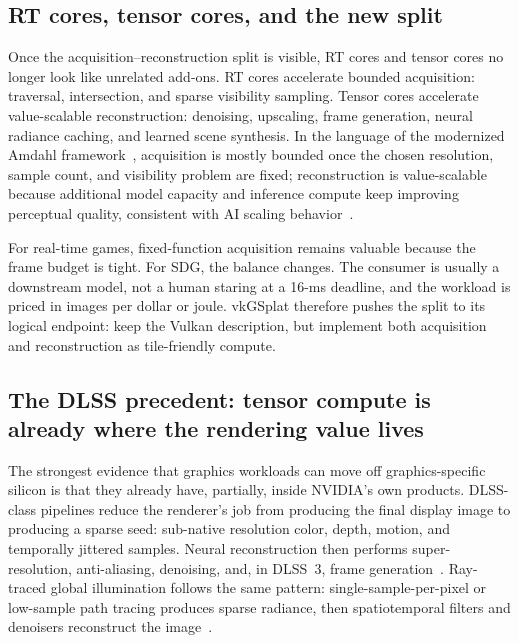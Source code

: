 \documentclass[10pt,journal]{IEEEtran}
\begin{document}
\subsection{RT cores, tensor cores, and the new split}

Once the acquisition--reconstruction split is visible, RT cores and
tensor cores no longer look like unrelated add-ons. RT cores accelerate
bounded acquisition: traversal, intersection, and sparse visibility
sampling. Tensor cores accelerate value-scalable reconstruction:
denoising, upscaling, frame generation, neural radiance caching, and
learned scene synthesis. In the language of the modernized Amdahl
framework~\cite{lu2026amdahl}, acquisition is mostly bounded once the
chosen resolution, sample count, and visibility problem are fixed;
reconstruction is value-scalable because additional model capacity and
inference compute keep improving perceptual quality, consistent with AI
scaling behavior~\cite{kaplan2020,lu2026}.

For real-time games, fixed-function acquisition remains valuable because
the frame budget is tight. For SDG, the balance changes. The consumer is
usually a downstream model, not a human staring at a 16-ms deadline, and
the workload is priced in images per dollar or joule. vkGSplat therefore
pushes the split to its logical endpoint: keep the Vulkan description,
but implement both acquisition and reconstruction as tile-friendly
compute.

\subsection{The DLSS precedent: tensor compute is already where the
rendering value lives}
\label{sec:dlss}

The strongest evidence that graphics workloads can move off
graphics-specific silicon is that they already have, partially, inside
NVIDIA's own products. DLSS-class pipelines reduce the renderer's job
from producing the final display image to producing a sparse seed:
sub-native resolution color, depth, motion, and temporally jittered
samples. Neural reconstruction then performs super-resolution,
anti-aliasing, denoising, and, in DLSS~3, frame
generation~\cite{nvidia-dlss,liu2020nsrr,edelsten2019dlss,nvidia-dlss3}.
Ray-traced global illumination follows the same pattern:
single-sample-per-pixel or low-sample path tracing produces sparse
radiance, then spatiotemporal filters and denoisers reconstruct the
image~\cite{schied2017svgf,chaitanya2017interactive,nvidia-nrd,bitterli2020restir}.
\end{document}
